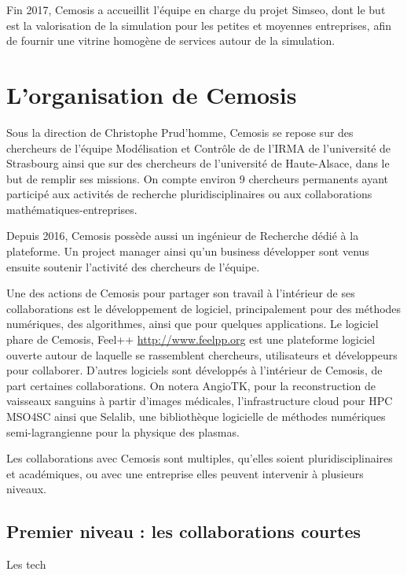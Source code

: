 \documentclass[12pt,a4paper]{article}
\begin{document}
 Fin 2017, Cemosis a accueillit l'équipe en charge du projet Simseo, dont le but est la valorisation de la simulation pour les petites et moyennes entreprises, afin de fournir une vitrine homogène de services autour de la simulation.
 

\vspace{1cm}

\section*{L'organisation de Cemosis}

Sous la direction de Christophe Prud'homme, Cemosis se repose sur des chercheurs de l'équipe Modélisation et Contrôle de de l'IRMA de l'université de Strasbourg ainsi que sur des chercheurs de l'université de Haute-Alsace, dans le but de remplir ses missions. On compte environ 9 chercheurs permanents ayant participé aux activités de recherche pluridisciplinaires ou aux collaborations mathématiques-entreprises.

Depuis 2016, Cemosis possède aussi un ingénieur de Recherche dédié à la plateforme. Un project manager ainsi qu'un business développer sont venus ensuite	 soutenir l'activité des chercheurs de l'équipe.

Une des actions de Cemosis pour partager son travail à l'intérieur de ses collaborations est le développement de logiciel, principalement pour des méthodes numériques, des algorithmes, ainsi que pour quelques applications.
Le logiciel phare de Cemosis, Feel++ \url{http://www.feelpp.org} est une plateforme logiciel ouverte autour de laquelle se rassemblent chercheurs, utilisateurs et développeurs pour collaborer.
D'autres logiciels sont développés à l'intérieur de Cemosis, de part certaines collaborations. On notera AngioTK, pour la reconstruction de vaisseaux sanguins à partir d'images médicales, l'infrastructure cloud pour HPC MSO4SC ainsi que Selalib, une bibliothèque logicielle de méthodes numériques semi-lagrangienne pour la physique des plasmas.

Les collaborations avec Cemosis sont multiples, qu'elles soient pluridisciplinaires et académiques, ou avec une entreprise elles peuvent intervenir à plusieurs niveaux.

\subsection*{Premier niveau : les collaborations courtes}
Les tech
\end{document}
